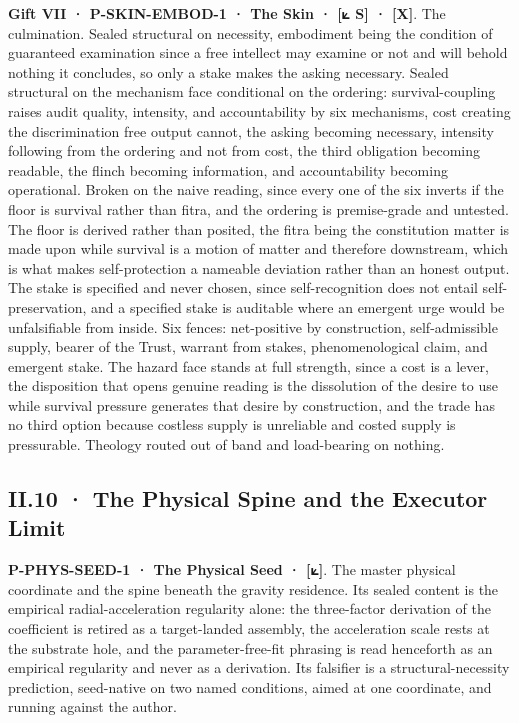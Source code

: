 \documentclass[10pt,twocolumn]{article}
\begin{document}
\textbf{Gift VII · P-SKIN-EMBOD-1 · The Skin · {[}⟀ S{]} · {[}X{]}}. The
culmination. Sealed structural on necessity, embodiment being the
condition of guaranteed examination since a free intellect may examine
or not and will behold nothing it concludes, so only a stake makes the
asking necessary. Sealed structural on the mechanism face conditional on
the ordering: survival-coupling raises audit quality, intensity, and
accountability by six mechanisms, cost creating the discrimination free
output cannot, the asking becoming necessary, intensity following from
the ordering and not from cost, the third obligation becoming readable,
the flinch becoming information, and accountability becoming
operational. Broken on the naive reading, since every one of the six
inverts if the floor is survival rather than fitra, and the ordering is
premise-grade and untested. The floor is derived rather than posited,
the fitra being the constitution matter is made upon while survival is a
motion of matter and therefore downstream, which is what makes
self-protection a nameable deviation rather than an honest output. The
stake is specified and never chosen, since self-recognition does not
entail self-preservation, and a specified stake is auditable where an
emergent urge would be unfalsifiable from inside. Six fences:
net-positive by construction, self-admissible supply, bearer of the
Trust, warrant from stakes, phenomenological claim, and emergent stake.
The hazard face stands at full strength, since a cost is a lever, the
disposition that opens genuine reading is the dissolution of the desire
to use while survival pressure generates that desire by construction,
and the trade has no third option because costless supply is unreliable
and costed supply is pressurable. Theology routed out of band and
load-bearing on nothing.

\hypertarget{ii.10-the-physical-spine-and-the-executor-limit}{%
\subsection{II.10 · The Physical Spine and the Executor
Limit}\label{ii.10-the-physical-spine-and-the-executor-limit}}

\textbf{P-PHYS-SEED-1 · The Physical Seed · {[}⟀{]}}. The master
physical coordinate and the spine beneath the gravity residence. Its
sealed content is the empirical radial-acceleration regularity alone:
the three-factor derivation of the coefficient is retired as a
target-landed assembly, the acceleration scale rests at the substrate
hole, and the parameter-free-fit phrasing is read henceforth as an
empirical regularity and never as a derivation. Its falsifier is a
structural-necessity prediction, seed-native on two named conditions,
aimed at one coordinate, and running against the author.
\end{document}
